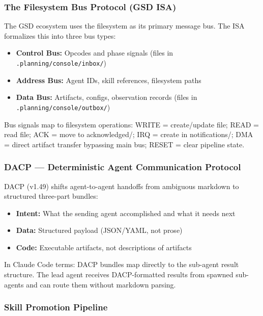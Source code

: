 \documentclass[11pt,letterpaper]{article}
\begin{document}
\subsubsection{The Filesystem Bus Protocol (GSD ISA)}

The GSD ecosystem uses the filesystem as its primary message bus. The ISA formalizes this into three bus types:
\begin{itemize}[leftmargin=1.5em]
  \item \textbf{Control Bus:} Opcodes and phase signals (files in \texttt{.planning/console/inbox/})
  \item \textbf{Address Bus:} Agent IDs, skill references, filesystem paths
  \item \textbf{Data Bus:} Artifacts, configs, observation records (files in \texttt{.planning/console/outbox/})
\end{itemize}

Bus signals map to filesystem operations: WRITE = create/update file; READ = read file; ACK = move to acknowledged/; IRQ = create in notifications/; DMA = direct artifact transfer bypassing main bus; RESET = clear pipeline state.

\subsubsection{DACP --- Deterministic Agent Communication Protocol}

DACP (v1.49) shifts agent-to-agent handoffs from ambiguous markdown to structured three-part bundles:
\begin{itemize}[leftmargin=1.5em]
  \item \textbf{Intent:} What the sending agent accomplished and what it needs next
  \item \textbf{Data:} Structured payload (JSON/YAML, not prose)
  \item \textbf{Code:} Executable artifacts, not descriptions of artifacts
\end{itemize}

In Claude Code terms: DACP bundles map directly to the sub-agent result structure. The lead agent receives DACP-formatted results from spawned sub-agents and can route them without markdown parsing.

\subsubsection{Skill Promotion Pipeline}
\end{document}
